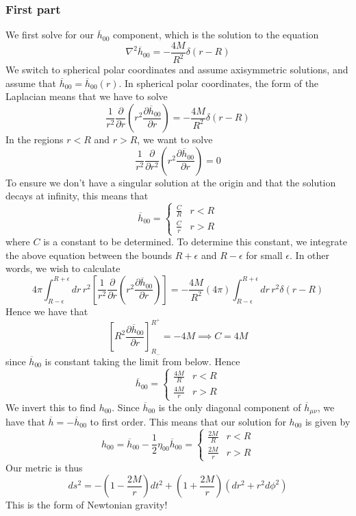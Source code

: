 \subsubsection{First part}
We first solve for our $ \overline{ h } _{ 00 } $ component, 
which is the solution to the equation 
\[
\nabla ^ 2 \overline{ h } _{ 00 }  = - \frac{ 4 M }{ R ^ 2 } \delta \left( r - R  \right) 
\] We switch to spherical polar coordinates and 
assume axisymmetric solutions, and assume that 
$ \overline{ h } _{ 00 }  = \overline{ h } _{ 00 } \left( r  \right)  $. 
In spherical polar coordinates, 
the form of the Laplacian means that 
we have to solve
\[
\frac{1}{ r^ 2  } \frac{\partial }{\partial r }  \left( r ^ 2 
\frac{\partial  \overline{ h } _{ 00  } }{\partial r  }  \right) 
=  - \frac{4 M }{ R ^ 2 } \delta \left( r - R  \right) 
\] 
In the regions $ r < R $ and $ r > R $, we 
want to solve 
\[
\frac{1}{ r ^ 2 } \frac{\partial  }{\partial  r ^ 2 }  \left( 
r ^ 2 \frac{\partial  \overline{ h } _{ 00 } }{\partial   r }  \right) = 0  
\] To ensure we don't have a singular solution at the origin
and that the solution decays at infinity, this means that 
\[
\overline{ h} _{ 00 }  = \begin{cases}
\frac{C}{ R } & r < R  \\ 
\frac{C}{r} & r > R 
\end{cases}
\] where $ C $ is a constant to be determined. 
To determine this constant, we integrate the 
above equation between the bounds $ R + \epsilon $ and $ R  - \epsilon $ 
for small $ \epsilon $. In other words, 
we wish to calculate 
\[
4 \pi \int_{ R - \epsilon } ^{  R + \epsilon } 
dr \, r ^ 2 \left[ \frac{1}{ r ^ 2 } \frac{\partial  }{\partial  r }  
\left( r ^ 2 \frac{\partial  \overline{ h } _{ 00 } }{\partial  r }   \right)  \right]   = - \frac{4 M }{ R ^ 2 } \left( 4 \pi  \right)  
\int_{ R - \epsilon } ^{ R + \epsilon }  dr \, r ^ 2 \delta \left( r - R  \right)  
\] Hence we have that 
\[
\left[  R ^ 2 \frac{\partial  \overline{ h } _{ 00 } }{\partial  r }   \right] ^{ R ^ + } _{ R _  -  }   =  - 4 M \implies C = 4 M  
\] since $ \overline{ h } _{ 00 } $ is constant taking the 
limit from below. 
Hence
\[
\overline{ h } _{ 00 }  = \begin{cases}
\frac{4M}{R } & r < R \\
\frac{4M}{r } & r > R 
\end{cases}
\] We invert this to find $ h_{ 00}  $. Since $ \overline{ h } _{ 00}  $ 
is the only diagonal component of $ \overline{ h } _{ \mu \nu } $, 
we have that $ \overline{ h }  =  - \overline{ h } _{ 00 } $ to first order. 
This means that our solution for $ h_{ 00 } $ is given by 
\[
h _{ 00 }  = \overline{ h } _{ 00 }  - \frac{1}{2 } \eta _{ 00 } \overline{ h } _{ 00 } = \begin{cases}
\frac{2M}{R  }  & r < R \\
\frac{2M}{ r } & r > R 
\end{cases} 
\] Our metric is thus 
\[
ds^ 2 =  - \left( 1  - \frac{2M}{ r }  \right) dt ^ 2  
+ \left( 1 + \frac{2M}{r }  \right)  \left( dr ^ 2 + r ^ 2 d \phi ^ 2  \right)  
\] This is the form of Newtonian gravity!

